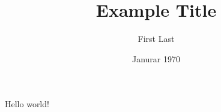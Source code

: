 \documentclass{article}
\title{Example Title}
\author{First Last}
\date{Janurar 1970}
\begin{document}
   \maketitle
   Hello world!
\end{document}
